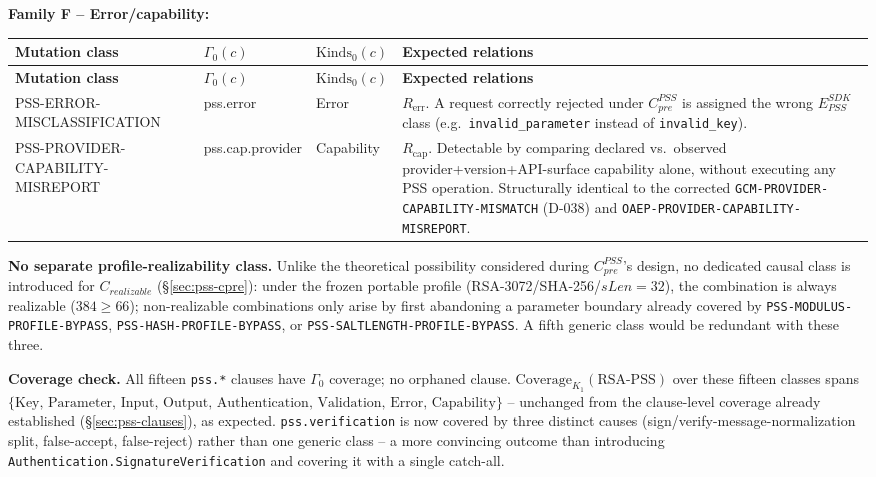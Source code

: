 \documentclass[11pt,a4paper]{article}
\begin{document}
\textbf{Family F -- Error/capability:}
\begin{longtable}{p{}p{}p{}p{}}
\toprule
\textbf{Mutation class} & \textbf{$\Gamma_0(c)$} & \textbf{$\text{Kinds}_0(c)$} & \textbf{Expected relations}\\
\midrule\endfirsthead
\toprule
\textbf{Mutation class} & \textbf{$\Gamma_0(c)$} & \textbf{$\text{Kinds}_0(c)$} & \textbf{Expected relations}\\
\midrule\endhead
PSS-ERROR-MISCLASSIFICATION & pss.error & Error & $R_{\text{err}}$. A request correctly rejected under $C_{pre}^{PSS}$ is assigned the wrong $E_{PSS}^{SDK}$ class (e.g.\ \texttt{invalid\_parameter} instead of \texttt{invalid\_key}).\\
PSS-PROVIDER-CAPABILITY-MISREPORT & pss.cap.provider & Capability & $R_{\text{cap}}$. Detectable by comparing declared vs.\ observed provider+version+API-surface capability alone, without executing any PSS operation. Structurally identical to the corrected \texttt{GCM-PROVIDER-CAPABILITY-MISMATCH} (D-038) and \texttt{OAEP-PROVIDER-CAPABILITY-MISREPORT}.\\
\bottomrule
\end{longtable}

\textbf{No separate profile-realizability class.} Unlike the theoretical possibility considered during $C_{pre}^{PSS}$'s design, no dedicated causal class is introduced for $C_{realizable}$ (\S\ref{sec:pss-cpre}): under the frozen portable profile (RSA-3072/SHA-256/$sLen=32$), the combination is always realizable ($384 \ge 66$); non-realizable combinations only arise by first abandoning a parameter boundary already covered by \texttt{PSS-MODULUS-PROFILE-BYPASS}, \texttt{PSS-HASH-PROFILE-BYPASS}, or \texttt{PSS-SALTLENGTH-PROFILE-BYPASS}. A fifth generic class would be redundant with these three.

\textbf{Coverage check.} All fifteen \texttt{pss.*} clauses have $\Gamma_0$ coverage; no orphaned clause. $\text{Coverage}_{K_1}(\text{RSA-PSS})$ over these fifteen classes spans $\{\text{Key, Parameter, Input, Output, Authentication, Validation, Error, Capability}\}$ -- unchanged from the clause-level coverage already established (\S\ref{sec:pss-clauses}), as expected. \texttt{pss.verification} is now covered by three distinct causes (sign/verify-message-normalization split, false-accept, false-reject) rather than one generic class -- a more convincing outcome than introducing \texttt{Authentication.SignatureVerification} and covering it with a single catch-all.
\end{document}
